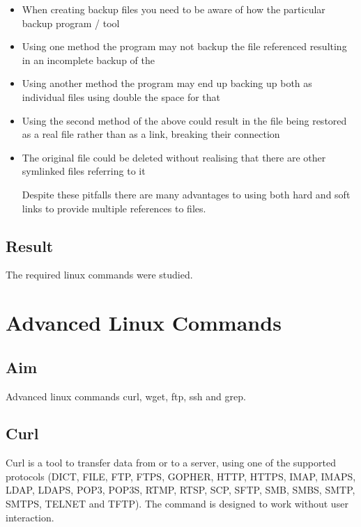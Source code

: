 \documentclass{article}
\begin{document}
\begin{itemize}
\begin{itemize}
\item When creating backup files you need to be aware of how the particular backup program / tool 

\item Using one method the program may not backup the file referenced resulting in an incomplete backup of the 

\item Using another method the program may end up backing up both as individual files using double the space for that 

\item Using the second method of the above could result in the file being restored as a real file rather than as a link, breaking their connection

\item The original file could be deleted without realising that there are other symlinked files referring to it

Despite these pitfalls there are many advantages to using both hard and soft links to provide multiple references to files.
				
\end{itemize}
\end{itemize}


\subsection {Result}

The required linux commands were studied.

\newpage
\section{Advanced Linux Commands}

\subsection{Aim}
Advanced linux commands curl, wget, ftp, ssh and grep.

\subsection{Curl}

Curl is a tool to transfer data from or to a server, using one of the supported protocols (DICT, FILE, FTP, FTPS, GOPHER, HTTP, HTTPS, IMAP, IMAPS, LDAP, LDAPS, POP3, POP3S, RTMP, RTSP, SCP, SFTP, SMB, SMBS, SMTP, SMTPS, TELNET and TFTP). The command is designed to work without user interaction.
\end{document}
